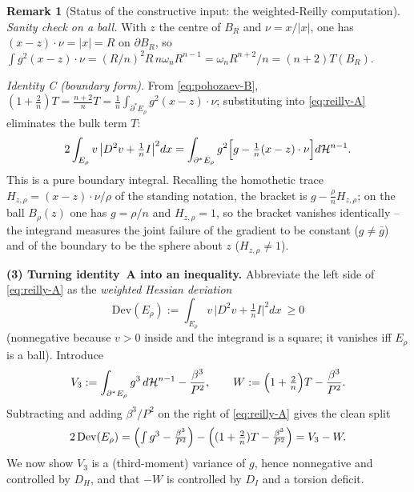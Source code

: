 \documentclass[11pt]{amsart}
\theoremstyle{definition}
\newtheorem{remark}[theorem]{Remark}
\newcommand{\Hn}{\mathcal H^{n-1}}
\begin{document}
\begin{remark}[Status of the constructive input: the weighted-Reilly computation]
\emph{Sanity check on a ball.}  With \(z\) the centre of \(B_R\) and
\(\nu=x/|x|\), one has \((x-z)\cdot\nu=|x|=R\) on \(\partial B_R\), so
\(\int g^2(x-z)\cdot\nu=(R/n)^2R\,n\omega_nR^{n-1}=\omega_nR^{n+2}/n
=(n+2)T(B_R)\).  \checkmark

\emph{Identity C (boundary form).}  From \eqref{eq:pohozaev-B},
\((1+\tfrac2n)T=\tfrac{n+2}{n}T=\tfrac1n\int_{\partial^*E_\rho}g^2(x-z)\cdot\nu\);
substituting into \eqref{eq:reilly-A} eliminates the bulk term \(T\):
\begin{equation}\label{eq:reilly-C}
   2\int_{E_\rho}v\,\bigl|D^2v+\tfrac1n I\bigr|^2dx
   =\int_{\partial^*E_\rho}g^2\Bigl[g-\tfrac1n(x-z)\cdot\nu\Bigr]d\Hn .
\end{equation}
This is a pure boundary integral.  Recalling the homothetic trace
\(H_{z,\rho}=(x-z)\cdot\nu/\rho\) of the standing notation, the bracket is
\(g-\tfrac\rho n H_{z,\rho}\); on the ball \(B_\rho(z)\) one has \(g=\rho/n\) and
\(H_{z,\rho}=1\), so the bracket vanishes identically -- the integrand measures
the joint failure of the gradient to be constant (\(g\ne\bar g\)) and of the
boundary to be the sphere about \(z\) (\(H_{z,\rho}\ne1\)).

\medskip
\noindent\textbf{(3) Turning identity~A into an inequality.}
Abbreviate the left side of \eqref{eq:reilly-A} as the \emph{weighted Hessian
deviation}
\[
   \mathrm{Dev}(E_\rho):=\int_{E_\rho}v\,\bigl|D^2v+\tfrac1n I\bigr|^2dx\ \ge0
\]
(nonnegative because \(v>0\) inside and the integrand is a square; it vanishes
iff \(E_\rho\) is a ball).  Introduce
\[
   V_3:=\int_{\partial^*E_\rho}g^3\,d\Hn-\frac{\beta^3}{P^2},
   \qquad
   W:=\Bigl(1+\tfrac2n\Bigr)T-\frac{\beta^3}{P^2}.
\]
Subtracting and adding \(\beta^3/P^2\) on the right of \eqref{eq:reilly-A} gives
the clean split
\begin{equation}\label{eq:reilly-R}
   2\,\mathrm{Dev}(E_\rho)
   =\Bigl(\textstyle\int g^3-\frac{\beta^3}{P^2}\Bigr)
   -\Bigl((1+\tfrac2n)T-\frac{\beta^3}{P^2}\Bigr)
   =V_3-W .
\end{equation}
We now show \(V_3\) is a (third-moment) variance of \(g\), hence nonnegative and
controlled by \(D_H\), and that \(-W\) is controlled by \(D_I\) and a torsion
deficit.


\end{remark}
\end{document}
